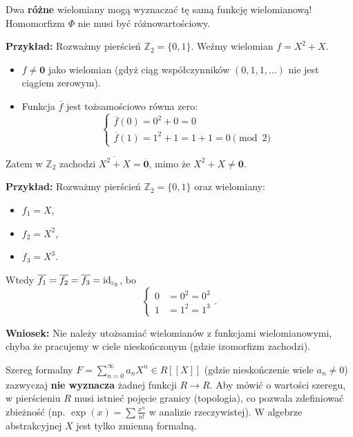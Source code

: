 \begin{remark}[O niejednoznaczności]
    Dwa \textbf{różne} wielomiany mogą wyznaczać tę samą funkcję wielomianową! Homomorfizm $\Phi$ nie musi być różnowartościowy. 

    \textbf{Przykład:} Rozważmy pierścień $\mathbb{Z}_2 = \{0, 1\}$. Weźmy wielomian $f = X^2 + X$.
    \begin{itemize}
        \item $f \neq \mathbf{0}$ jako wielomian (gdyż ciąg współczynników $(0, 1, 1, \dots)$ nie jest ciągiem zerowym).
        \item Funkcja $\overline{f}$ jest tożsamościowo równa zero:
        \[ 
            \begin{cases}
                \overline{f}(0) = 0^2 + 0 = 0 \\
                \overline{f}(1) = 1^2 + 1 = 1+1 = 0 \pmod 2
            \end{cases}
        \]
    \end{itemize}
    Zatem w $\mathbb{Z}_2$ zachodzi $\overline{X^2+X} = \overline{\mathbf{0}}$, mimo że $X^2+X \neq \mathbf{0}$.
    
    \textbf{Przykład:} Rozważmy pierścień $\mathbb{Z}_{2} = \{0,1\} $ oraz wielomiany:
    \begin{itemize}
    	\item $f_1 = X$,
	\item $f_2 = X^2$,
	\item $f_3 = X^3$.
    \end{itemize}
Wtedy $\overline{f_1} = \overline{f_2} = \overline{f_3} = \operatorname{id}_{\scriptscriptstyle \mathbb{Z}_{2}}$, bo
\[
			\begin{cases}
				0 &= 0^2 = 0^3 \\
				1 &= 1^2 = 1^3
			\end{cases}
.\] 


    \textbf{Wniosek:} Nie należy utożsamiać wielomianów z funkcjami wielomianowymi, chyba że pracujemy w ciele nieskończonym (gdzie izomorfizm zachodzi).
\end{remark}

\begin{remark}
    Szereg formalny $F = \sum_{n=0}^{\infty} a_n X^n \in R[[X]]$ (gdzie nieskończenie wiele $a_n \neq 0$) zazwyczaj \textbf{nie wyznacza} żadnej funkcji $R \to R$. 
    Aby mówić o wartości szeregu, w pierścieniu $R$ musi istnieć pojęcie granicy (topologia), co pozwala zdefiniować zbieżność (np. $\exp(x) = \sum \frac{x^n}{n!}$ w analizie rzeczywistej). W algebrze abstrakcyjnej $X$ jest tylko zmienną formalną.
\end{remark}

